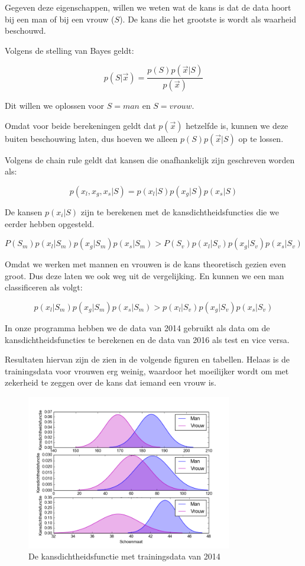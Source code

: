 \documentclass[a4paper,12px]{article}
\begin{document}
Gegeven deze eigenschappen, willen we weten wat de kans is dat de data hoort bij
een man of bij een vrouw ($S$). De kans die het grootste is wordt als waarheid
beschouwd.

Volgens de stelling van Bayes geldt:

$$ p(S|\vec x) = \frac{p(S)p(\vec x|S)}{p(\vec x)}$$

Dit willen we oplossen voor $S = man$ en $S = vrouw$.

Omdat voor beide berekeningen geldt dat $p(\vec x)$ hetzelfde is, kunnen we deze
buiten beschouwing laten, dus hoeven we alleen $p(S)p(\vec x|S)$ op te
lossen.

Volgens de chain rule geldt dat kansen die onafhankelijk zijn geschreven worden
als:

$$p(x_l, x_g, x_s|S) = p(x_l|S)p(x_g|S)p(x_s|S)$$

De kansen $p(x_i|S)$ zijn te berekenen met de kansdichtheidsfuncties die we
eerder hebben opgesteld.


$$P(S_m)p(x_l|S_m)p(x_g|S_m)p(x_s|S_m) > P(S_v)p(x_l|S_v)p(x_g|S_v)p(x_s|S_v)$$

Omdat we werken met mannen en vrouwen is de kans theoretisch gezien even groot.
Dus deze laten we ook weg uit de vergelijking. En kunnen we een man
classificeren als volgt:

$$p(x_l|S_m)p(x_g|S_m)p(x_s|S_m) > p(x_l|S_v)p(x_g|S_v)p(x_s|S_v)$$

In onze programma hebben we de data van 2014 gebruikt als data om de
kansdichtheidsfuncties te berekenen en de data van 2016 als test en vice versa.

Resultaten hiervan zijn de zien in de volgende figuren en tabellen. Helaas is
de trainingsdata voor vrouwen erg weinig, waardoor het moeilijker wordt om met
zekerheid te zeggen over de kans dat iemand een vrouw is.

\begin{figure}[h!]
    \centering
    \includegraphics[width=0.8\textwidth]{sex14.png}
    \caption{De kansdichtheidsfunctie met trainingsdata van 2014}
    \label{fig:sex_image}
\end{figure}
\FloatBarrier
\end{document}
